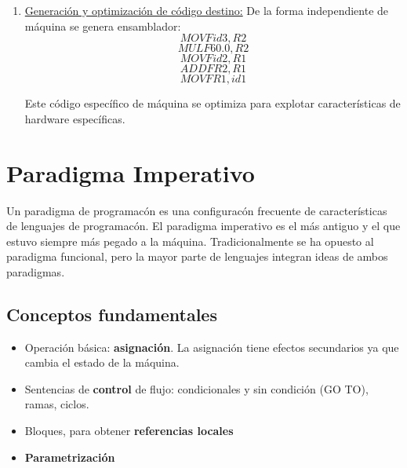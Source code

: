 \documentclass[10pt,a4paper]{report}
\begin{document}
\begin{enumerate}
	\item \underline{Generación y optimización de código destino:} De la forma 
	independiente de máquina se genera ensamblador:
	\begin{equation}
	 MOVF id3, R2
	 \end{equation}
	 \begin{equation}
     MULF 60.0, R2
     \end{equation}
     \begin{equation}
     MOVF id2, R1
     \end{equation}
     \begin{equation}
     ADDF R2, R1
     \end{equation}
     \begin{equation}
  	 MOVF R1, id1
     \end{equation}
     
     \par Este código específico de máquina se optimiza para explotar 
     características de hardware específicas.
	
\end{enumerate}


\section{Paradigma Imperativo}

\par Un paradigma de programacón es una configuracón frecuente de 
características de lenguajes de programacón. El paradigma imperativo es el 
más antiguo y el que estuvo siempre más pegado a la máquina. 
Tradicionalmente se ha opuesto al paradigma funcional, pero la mayor parte 
de lenguajes integran ideas de ambos paradigmas.

\subsection{Conceptos fundamentales}

	\begin{itemize}
	 	\item Operación básica: \textbf{asignación}. La asignación tiene 
	 	efectos secundarios ya que cambia el estado de la máquina.
		\item Sentencias de \textbf{control} de flujo: condicionales y sin 
		condición (GO TO), ramas, ciclos.
		\item Bloques, para obtener \textbf{referencias locales}
  		\item \textbf{Parametrización}
	\end{itemize}
\end{document}
